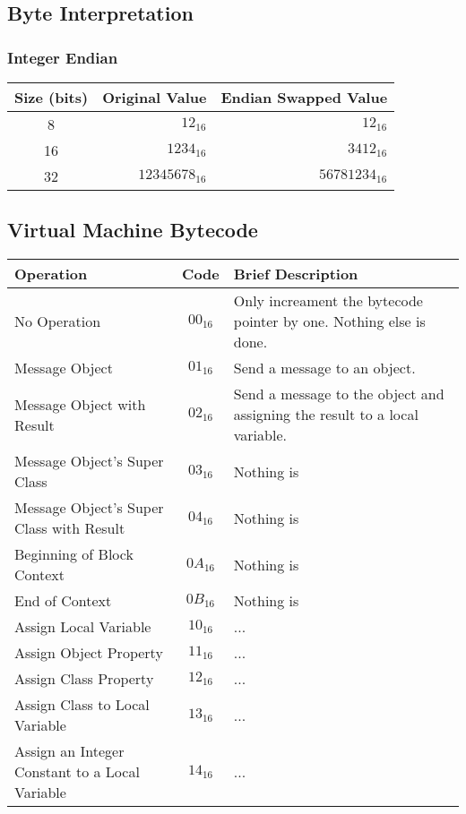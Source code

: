 \subsection {Byte Interpretation}

\subsubsection{Integer Endian}

\begin{center}
  \begin{tabular}{ c r r }
    Size (bits) & Original Value & Endian Swapped Value\\ \hline
    8 & $12_{16}$ & $12_{16}$ \\
    16 & $1234_{16}$ & $3412_{16}$ \\
    32 & $12345678_{16}$ & $56781234_{16}$ \\
  \end{tabular}
\end{center}

\subsection{Virtual Machine Bytecode}

\begin{center}
  \begin{tabular}{ | p{6cm} | c | p{8cm} | }
    \hline
    Operation & Code & Brief Description \\ \hline
    No Operation & $00_{16}$ & Only increament the bytecode pointer by one.
                              Nothing else is done. \\
    Message Object & $01_{16}$ & Send a message to an object. \\
    Message Object with Result & $02_{16}$ & Send a message to the object
                                            and assigning the result to a
                                            local variable. \\
    Message Object's Super Class & $03_{16}$ & Nothing is \\
    Message Object's Super Class with Result & $04_{16}$ & Nothing is \\
    Beginning of Block Context & $0A_{16}$ & Nothing is \\
    End of Context & $0B_{16}$ & Nothing is \\
    Assign Local Variable & $10_{16}$ & ...\\
    Assign Object Property & $11_{16}$ & ...\\
    Assign Class Property & $12_{16}$ & ...\\
    Assign Class to Local Variable & $13_{16}$ & ...\\
    Assign an Integer Constant to a Local Variable & $14_{16}$ & ...\\
    \hline
  \end{tabular}
\end{center}

